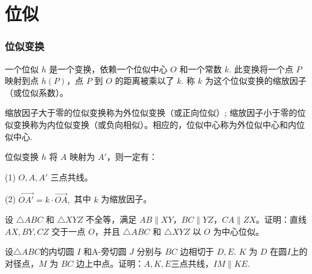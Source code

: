 \part{位似}
\section{位似变换}

\begin{definition}[位似变换]
    一个位似 $h$ 是一个变换，依赖一个位似中心 $O$ 和一个常数 $k$. 此变换将一个点 $P$ 映射到点 $h(P)$，点 $P$ 到 $O$ 的距离被乘以了 $k$. 称 $k$ 为这个位似变换的缩放因子（或位似系数）。

    
\end{definition}

\begin{proposition}
    缩放因子大于零的位似变换称为外位似变换（或正向位似）; 缩放因子小于零的位似变换称为内位似变换（或负向相似）。相应的，位似中心称为外位似中心和内位似中心.  
\end{proposition}

\begin{proposition}
    位似变换 $h$ 将 $A$ 映射为 $A'$，则一定有：

    (1) $O, A, A'$ 三点共线。

    (2) $\overrightarrow{OA'} = k \cdot \overrightarrow{OA},$ 其中 $k$ 为缩放因子。
\end{proposition}


\begin{lemma}[位似三角形]
    设 $\triangle ABC$ 和 $\triangle XYZ$ 不全等，满足 $AB \parallel XY$，$BC \parallel YZ$，$CA \parallel ZX$。证明：直线 $AX, BY, CZ$ 交于一点 $O$，并且 $\triangle ABC$ 和 $\triangle XYZ$ 以 $O$ 为中心位似。
\end{lemma}


\begin{exercise}
    设$\triangle ABC$的内切圆 $I$ 和A-旁切圆 $J$ 分别与 $BC$ 边相切于 $D, E$. $K$ 为 $D$ 在圆$I$上的对径点，$M$ 为 $BC$ 边上中点。证明：$A,K,E$三点共线，$IM \parallel KE.$
\end{exercise}
